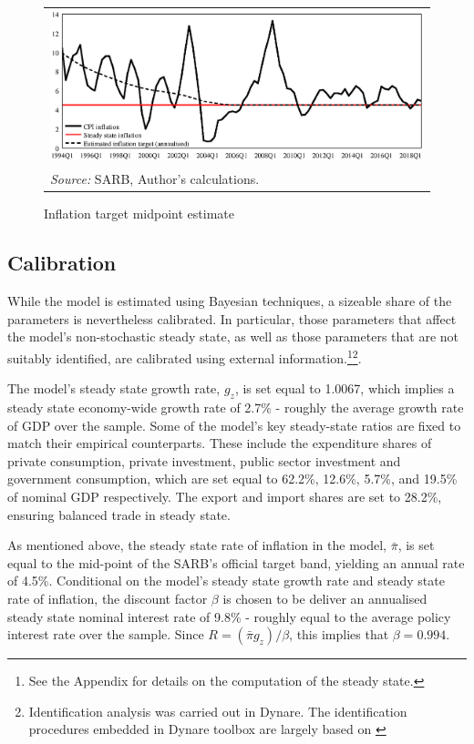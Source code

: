 \documentclass[a4paper,11pt]{article}
\numberwithin{equation}{section}
\begin{document}
	\begin{figure}[t]
		\centering
		\caption{Inflation target midpoint estimate}
		\begin{tabular}{p{16cm}}
			\includegraphics[trim=1.5cm 0.75cm 0 1cm]{cpi_target.eps}\\
			{\footnotesize \textit{Source:} SARB, Author's calculations.}\\
		\end{tabular}
		\label{fig_cpi_target}
	\end{figure} 
	
	\subsection{Calibration}
	
	While the model is estimated using Bayesian techniques, a sizeable share of the parameters is nevertheless calibrated. In particular, those parameters that affect the model's non-stochastic steady state, as well as those parameters that are not suitably identified, are calibrated using external information.\footnote{See the Appendix for details on the computation of the steady state.}\footnote{Identification analysis was carried out in Dynare. The identification procedures  embedded in Dynare toolbox are largely based on \cite{iskrev2010a, iskrev2010b}}.
	
	The model's steady state growth rate, $g_z$, is set equal to 1.0067, which implies a steady state economy-wide growth rate of 2.7\% - roughly	the average growth rate of GDP over the sample. Some of the model's key steady-state ratios are fixed to match their empirical counterparts. These include the expenditure shares of private consumption, private investment, public sector investment and government consumption, which are set equal to 62.2\%, 12.6\%, 5.7\%, and 19.5\% of nominal GDP respectively. The export and import shares are set to 28.2\%, ensuring balanced trade in steady state.
	
	As mentioned above, the steady state rate of inflation in the model, $\bar{\pi}$, is set equal to the mid-point of the SARB's official target band, yielding an annual rate of 4.5\%. Conditional on the model's steady state growth rate and steady state rate of inflation, the discount factor $\beta$ is chosen to be deliver an annualised steady state nominal interest rate of 9.8\% - roughly equal to the average policy interest rate over the sample. Since $R=(\bar{\pi}g_z)/\beta$, this implies that $\beta=0.994$.
	
\end{document}
